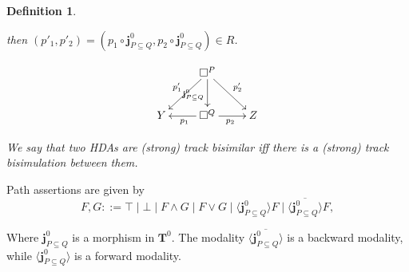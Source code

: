 \documentclass[11pt,a4paper,oldfontcommands]{memoir}
\newcommand{\TrO}{\mathbf{T}}
\newcommand*\jneda{\mathbf{j}}
\newtheorem{definition}{Definition}
\begin{document}
\begin{definition}
\begin{enumerate}
then $(p'_1,p'_2)=(p_1 \circ \jneda^0_{P \subseteq Q},p_2 \circ \jneda^0_{P \subseteq Q}) \in R$.

$$\xymatrix{
     &    \square^P \ar[dl]_{p'_1} \ar[d]_{\jneda^0_{P \subseteq Q}} \ar[dr]^{p'_2}   \\
   Y & \square^Q \ar[l]^{p_1 } \ar[r]_{p_2} &  Z                          }
$$

We say that two HDAs are (strong) track bisimilar iff there is a (strong) track bisimulation between them.
\end{enumerate}
\end{definition}

Path assertions are given by
$$
F,G::= \top \mid \bot \mid F \wedge G \mid F \vee G  \mid\langle \jneda^0_{P \subseteq Q} \rangle F\mid  \overline{\langle \jneda^0_{P \subseteq Q}\rangle} F,
$$

Where $\jneda^0_{P \subseteq Q}$ is a morphism in $\TrO^0$. The modality $\overline{\langle \jneda^0_{P \subseteq Q}\rangle}$ is a backward modality, while $\langle \jneda^0_{P \subseteq Q}\rangle$ is a forward modality. 
\end{document}

